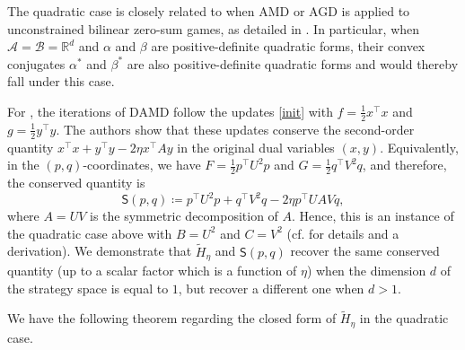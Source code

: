 \documentclass[11pt]{article}
\newcommand{\R}{\mathbb{R}}
\newcommand{\A}{\mathcal{A}}
\newcommand{\B}{\mathcal{B}}
\begin{document}
The quadratic case is closely related to when AMD or AGD is applied to unconstrained bilinear zero-sum games, as detailed in \cite{pmlr-v125-bailey20a}. In particular, when $\A=\B=\R^{d}$ and $\alpha$ and $\beta$ are positive-definite quadratic forms, their convex conjugates $\alpha^{*}$ and $\beta^{*}$ are also positive-definite quadratic forms and would thereby fall under this case.

For \cite{pmlr-v125-bailey20a}, the iterations of DAMD follow the updates \eqref{init} with $f=\frac{1}{2}x^{\top}x$ and $g=\frac{1}{2}y^{\top}y$. The authors show that these updates conserve the second-order quantity $x^{\top}x+y^{\top}y-2\eta x^{\top}Ay$ in the original dual variables $(x,y)$. Equivalently, in the $(p,q)$-coordinates, we have $F=\frac{1}{2}p^{\top}U^{2}p$ and $G=\frac{1}{2}q^{\top}V^{2}q$, and therefore, the conserved quantity is
$$\mathsf{S}\left(p,q\right)\coloneqq p^{\top}U^{2}p+q^{\top}V^{2}q-2\eta p^{\top}UAVq,$$ where $A = UV$ is the symmetric decomposition of $A$. Hence,
this is an instance of the quadratic case above with $B=U^{2}$ and $C=V^{2}$ (cf. \cite[][Theorem~4]{pmlr-v125-bailey20a} for details and a derivation). We demonstrate that $\widetilde{H}_{\eta}$ and $\mathsf{S}\left(p,q\right)$ recover the same conserved quantity (up to a scalar factor which is a function of $\eta$) when the dimension $d$ of the strategy space is equal to $1$, but recover a different one when $d>1$.

We have the following theorem regarding the closed form of $\widetilde{H}_{\eta}$ in the quadratic case.
\end{document}

